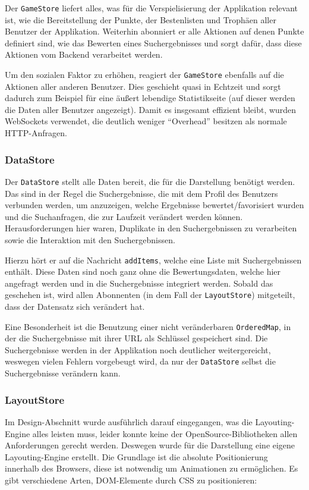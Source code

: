 \documentclass[12pt,twoside]{book}
\begin{document}
Der \texttt{GameStore} liefert alles, was für die Verspielisierung der Applikation relevant ist, wie die Bereitstellung der Punkte, der Bestenlisten und Trophäen aller Benutzer der Applikation. Weiterhin abonniert er alle Aktionen auf denen Punkte definiert sind, wie das Bewerten eines Suchergebnisses und sorgt dafür, dass diese Aktionen vom Backend verarbeitet werden.

Um den sozialen Faktor zu erhöhen, reagiert der \texttt{GameStore} ebenfalls auf die Aktionen aller anderen Benutzer. Dies geschieht quasi in Echtzeit und sorgt dadurch zum Beispiel für eine äußert lebendige Statistikseite (auf dieser werden die Daten aller Benutzer angezeigt).
Damit es insgesamt effizient bleibt, wurden WebSockets verwendet, die deutlich weniger ``Overhead'' besitzen als normale HTTP-Anfragen.

\subsubsection*{DataStore}

Der \texttt{DataStore} stellt alle Daten bereit, die für die Darstellung benötigt werden. Das sind in der Regel die Suchergebnisse, die mit dem Profil des Benutzers verbunden werden, um anzuzeigen, welche Ergebnisse bewertet/favorisiert wurden und die Suchanfragen, die zur Laufzeit verändert werden können. Herausforderungen hier waren, Duplikate in den Suchergebnissen zu verarbeiten sowie die Interaktion mit den Suchergebnissen.

Hierzu hört er auf die Nachricht \texttt{addItems}, welche eine Liste mit Suchergebnissen enthält. Diese Daten sind noch ganz ohne die Bewertungsdaten, welche hier angefragt werden und in die Suchergebnisse integriert werden. Sobald das geschehen ist, wird allen Abonnenten (in dem Fall der \texttt{LayoutStore}) mitgeteilt, dass der Datensatz sich verändert hat.

Eine Besonderheit ist die Benutzung einer nicht veränderbaren \texttt{OrderedMap}, in der die Suchergebnisse mit ihrer URL als Schlüssel gespeichert sind. Die Suchergebnisse werden in der Applikation noch deutlicher weitergereicht, weswegen vielen Fehlern vorgebeugt wird, da nur der \texttt{DataStore} selbst die Suchergebnisse verändern kann.

\subsubsection*{LayoutStore}

Im Design-Abschnitt wurde ausführlich darauf eingegangen, was die Layouting-Engine alles leisten muss, leider konnte keine der OpenSource-Bibliotheken allen Anforderungen gerecht werden. Deswegen wurde für die Darstellung eine eigene Layouting-Engine erstellt.
Die Grundlage ist die absolute Positionierung innerhalb des Browsers, diese ist notwendig um Animationen zu ermöglichen. Es gibt verschiedene Arten, DOM-Elemente durch CSS zu positionieren:
\end{document}
